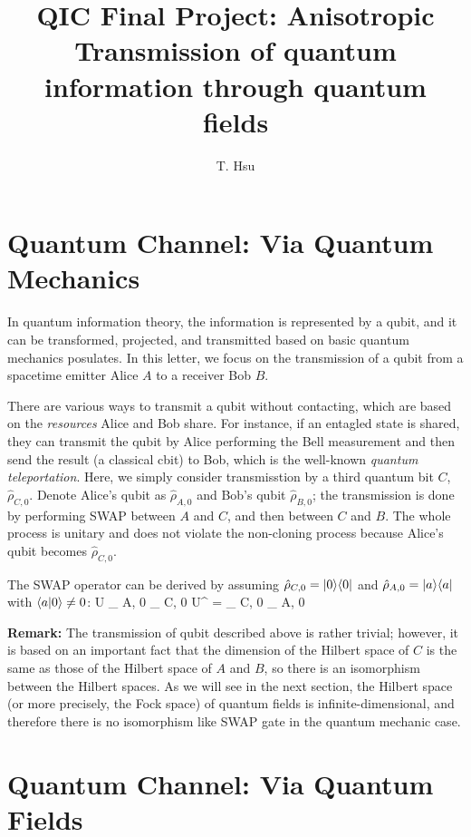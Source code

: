 \documentclass[a4paper,12pt]{article}
\title{QIC Final Project: Anisotropic Transmission of quantum information through quantum fields}
\author{T. Hsu}
\affiliation{National Taiwan University,\\
Taipei, Taiwan}
\begin{document}
\maketitle
\flushbottom
\section{Quantum Channel: Via Quantum Mechanics}
In quantum information theory, the information is represented by a qubit, and it can be transformed, projected, and transmitted based on basic quantum mechanics posulates.
In this letter, we focus on the transmission of a qubit from a spacetime emitter Alice $ A $ to a receiver Bob $ B $.

There are various ways to transmit a qubit without contacting, which are based on the \textit{resources} Alice and Bob share.
For instance, if an entagled state is shared, they can transmit the qubit by Alice performing the Bell measurement and then send the result (a classical cbit) to Bob, which is the well-known \textit{quantum teleportation}.
Here, we simply consider transmisstion by a third quantum bit $ C $, $ \hat \rho_{ C, 0 } $.
Denote Alice's qubit as $ \hat \rho_{ A, 0 } $ and Bob's qubit $ \hat \rho_{ B, 0 }$; the transmission is done by performing SWAP between $ A $ and $ C $, and then between $ C $ and $ B $. 
The whole process is unitary and does not violate the non-cloning process because Alice's qubit becomes $ \hat \rho_{ C, 0 } $.

The SWAP operator can be derived by assuming $ \hat \rho_{ C, 0 } = | 0 \rangle \langle 0 |$ and $ \hat \rho_{ A, 0 } = | a \rangle \langle a | $ with $ \langle a | 0 \rangle \ne 0 $:
\be
    U \rho_{ A, 0 } \otimes \rho_{ C, 0 } U^{\dagger} = \rho_{ C, 0 } \otimes \rho_{ A, 0 }
\ee


\textbf{Remark: }
The transmission of qubit described above is rather trivial; however, it is based on an important fact that the dimension of the Hilbert space of $ C $ is the same as those of the Hilbert space of $ A $ and $ B $, so there is an isomorphism between the Hilbert spaces.
As we will see in the next section, the Hilbert space (or more precisely, the Fock space) of quantum fields is infinite-dimensional, and therefore there is no isomorphism like SWAP gate in the quantum mechanic case.
\section{Quantum Channel: Via Quantum Fields}
\end{document}
